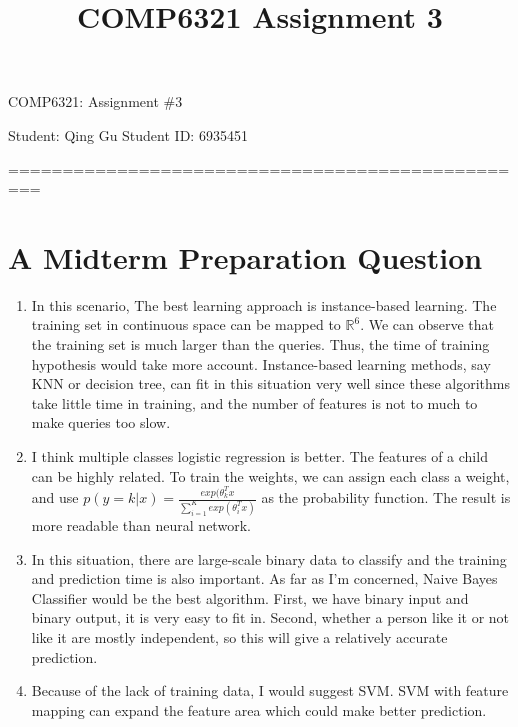 \documentclass[a4paper, 12pt, titlepage]{article}
\begin{document}
\title{COMP6321 Assignment 3}
\setcounter{tocdepth}{2}
\newpage
\begin{center}
    {\huge COMP6321: Assignment \#3}


    \vspace{2cm}
    Student: Qing Gu  \hspace{5cm}
    Student ID: 6935451
    \vspace{1cm}

    =================================================
\end{center}
\section{A Midterm Preparation Question}
\begin{enumerate}
    \item In this scenario, The best learning approach is instance-based learning. The training set in continuous space can be mapped to $\mathbb{R}^6$. We can observe that the training set is much larger than the queries. Thus, the time of training hypothesis would take more account. Instance-based learning methods, say KNN or decision tree, can fit in this situation very well since these algorithms take little time in training, and the number of features is not to much to make queries too slow. 
    \item I think multiple classes logistic regression is better. The features of a child can be highly related. To train the weights, we can assign each class a weight, and use $p(y=k|x)=\frac{exp(\theta_k^Tx}{\sum_{i=1}^Kexp(\theta_i^Tx)}$ as the probability function. The result is more readable than neural network.
    \item In this situation, there are large-scale binary data to classify and the training and prediction time is also important. As far as I'm concerned, Naive Bayes Classifier would be the best algorithm. First, we have binary input and binary output, it is very easy to fit in. Second, whether a person like it or not like it are mostly independent, so this will give a relatively accurate prediction.
    \item Because of the lack of training data, I would suggest SVM. SVM with feature mapping can expand the feature area which could make better prediction.
\end{enumerate}
\end{document}
